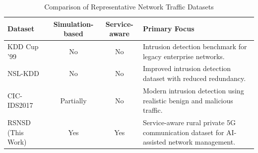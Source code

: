 \documentclass[12pt,a4paper]{report}
\begin{document}

	\begin{table}[H]
		\centering
		\caption{Comparison of Representative Network Traffic Datasets}
		\label{tab:dataset_comparison}
		
		\begin{tabular}{|p{3cm}|c|c|p{5.2cm}|}
			\hline
			
			\textbf{Dataset} &
			\textbf{Simulation-based} &
			\textbf{Service-aware} &
			\textbf{Primary Focus}
			\\
			\hline
			
			KDD Cup '99 &
			No &
			No &
			Intrusion detection benchmark for legacy enterprise networks.
			\\
			\hline
			
			NSL-KDD &
			No &
			No &
			Improved intrusion detection dataset with reduced redundancy.
			\\
			\hline
			
			CIC-IDS2017 &
			Partially &
			No &
			Modern intrusion detection using realistic benign and malicious traffic.
			\\
			\hline
			
			RSNSD (This Work) &
			Yes &
			Yes &
			Service-aware rural private 5G communication dataset for AI-assisted network management.
			\\
			\hline
			
		\end{tabular}
		
	\end{table}
\end{document}
